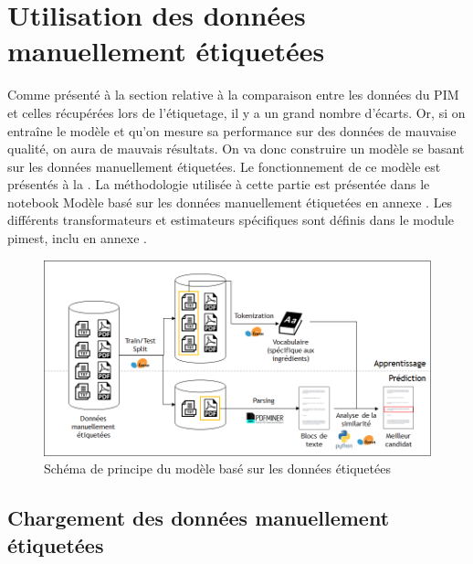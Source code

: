     \chapter{Utilisation des données manuellement étiquetées}

    Comme présenté à la section relative à la comparaison entre les données du PIM et celles récupérées lors de l'étiquetage, il y a un grand nombre d'écarts.
    Or, si on entraîne le modèle et qu'on mesure sa performance sur des données de mauvaise qualité, on aura de mauvais résultats.
    On va donc construire un modèle se basant sur les données manuellement étiquetées.
    Le fonctionnement de ce modèle est présentés à la .
    La méthodologie utilisée à cette partie est présentée dans le notebook \og Modèle basé sur les données manuellement étiquetées \fg en annexe .
    Les différents transformateurs et estimateurs spécifiques sont définis dans le module pimest, inclu en annexe .
    
    \begin{figure}[htbp]
        \begin{center}
        \includegraphics[width=0.9\linewidth]{img/ground_truth_model.png}
        \end{center}
        \caption{Schéma de principe du modèle basé sur les données étiquetées}
        \label{fig:ground_truth_model}
    \end{figure}     

        \section{Chargement des données manuellement étiquetées}

